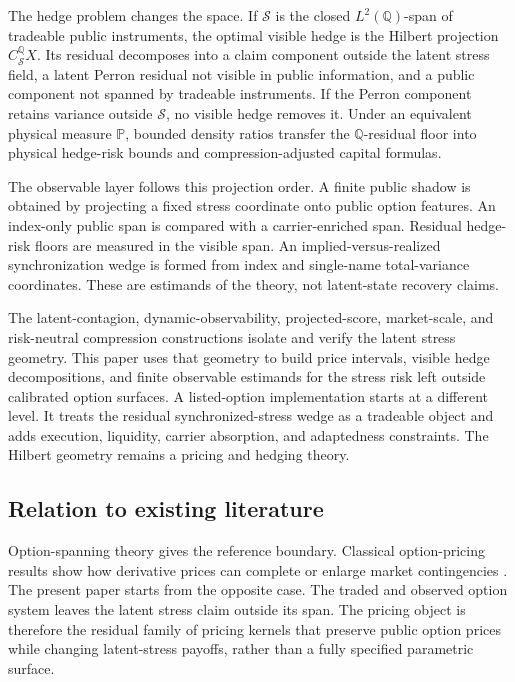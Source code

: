 \documentclass[11pt,a4paper]{amsart}
\theoremstyle{plain}
\theoremstyle{definition}
\theoremstyle{remark}
\newcommand{\PP}{\mathbb{P}}
\newcommand{\QQ}{\mathbb{Q}}
\newcommand{\cS}{\mathcal{S}}
\begin{document}
The hedge problem changes the space.  If \(\cS\) is the closed \(L^2(\QQ)\)-span of tradeable
public instruments, the optimal visible hedge is the Hilbert projection \(C_{\cS}^{\QQ}X\).  Its
residual decomposes into a claim component outside the latent stress field, a latent Perron
residual not visible in public information, and a public component not spanned by tradeable
instruments.  If the Perron component retains variance outside \(\cS\), no visible hedge removes
it.  Under an equivalent physical measure \(\PP\), bounded density ratios transfer the
\(\QQ\)-residual floor into physical hedge-risk bounds and compression-adjusted capital formulas.

The observable layer follows this projection order.  A finite public shadow is obtained by
projecting a fixed stress coordinate onto public option features.  An index-only public span is
compared with a carrier-enriched span.  Residual hedge-risk floors are measured in the visible
span.  An implied-versus-realized synchronization wedge is formed from index and single-name
total-variance coordinates.  These are estimands of the theory, not latent-state recovery claims.

The latent-contagion, dynamic-observability, projected-score, market-scale, and risk-neutral
compression constructions
\cite{vidal2026latent,vidal2026dynamic,vidal2026econometric,vidal2026market,
vidal2026compression} isolate and verify the latent stress geometry.  This paper uses that geometry
to build price intervals, visible hedge decompositions, and finite observable estimands for the
stress risk left outside calibrated option surfaces.  A listed-option implementation starts at a
different level.  It treats the residual synchronized-stress wedge as a tradeable object and adds
execution, liquidity, carrier absorption, and adaptedness constraints.  The Hilbert geometry remains
a pricing and hedging theory.

\subsection*{Relation to existing literature}

Option-spanning theory gives the reference boundary.  Classical option-pricing results show how
derivative prices can complete or enlarge market contingencies
\cite{blackScholes1973,merton1973,ross1976,bakshiMadan2000}.  The present paper starts from the
opposite case.  The traded and observed option system leaves the latent stress claim outside its span.  The pricing
object is therefore the residual family of pricing kernels that preserve public option prices while
changing latent-stress payoffs, rather than a fully specified parametric surface.
\end{document}
